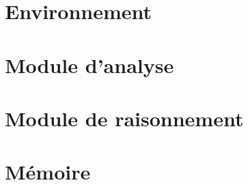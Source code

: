 
\section{Environnement}



\section{Module d'analyse}



\section{Module de raisonnement}



\section{Mémoire}

